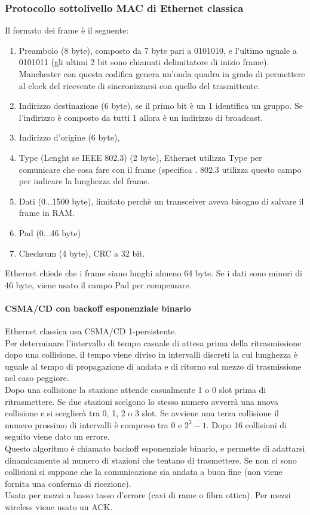\documentclass{article}
\begin{document}
\subsubsection{Protocollo sottolivello MAC di Ethernet classica}
Il formato dei frame è il seguente:
\begin{enumerate}
\item Preambolo (8 byte), composto da 7 byte pari a 0101010, e l'ultimo uguale a 0101011 (gli ultimi 2 bit sono chiamati delimitatore di inizio frame). \\
Manchester con questa codifica genera un'onda quadra in grado di permettere al clock del ricevente di sincronizzarsi con quello del trasmittente. \\
\item Indirizzo destinazione (6 byte), se il primo bit è un 1 identifica un gruppo. Se l'indirizzo è composto da tutti 1 allora è un indirizzo di broadcast.
\item Indirizzo d'origine (6 byte), 
\item Type (Lenght se IEEE 802.3) (2 byte), Ethernet utilizza Type per comunicare che cosa fare con il frame (specifica . 802.3 utilizza questo campo per indicare la lunghezza del frame. 
\item Dati (0...1500 byte), limitato perchè un transceiver aveva bisogno di salvare il frame in RAM. 
\item Pad (0...46 byte)
\item Checksum (4 byte), CRC a 32 bit. 
\end{enumerate}
Ethernet chiede che i frame siano lunghi almeno 64 byte. Se i dati sono minori di 46 byte, viene usato il campo Pad per compensare.
\paragraph{CSMA/CD con backoff esponenziale binario}
Ethernet classica usa CSMA/CD 1-persistente. \\
Per determinare l'intervallo di tempo casuale di attesa prima della ritrasmissione dopo una collisione, il tempo viene diviso in intervalli discreti la cui lunghezza è uguale al tempo di propagazione di andata e di ritorno sul mezzo di trasmissione nel caso peggiore.\\
Dopo una collisione la stazione attende casualmente 1 o 0 slot prima di ritrasmettere. Se due stazioni scelgono lo stesso numero avverrà una nuova collisione e si sceglierà tra 0, 1, 2 o 3 slot. Se avviene una terza collisione il numero prossimo di intervalli è compreso tra 0 e $2^3 -1$. Dopo 16 collisioni di seguito viene dato un errore. \\
Questo algoritmo è chiamato backoff esponenziale binario, e permette di adattarsi dinamicamente al numero di stazioni che tentano di trasmettere. Se non ci sono collisioni si suppone che la comunicazione sia andata a buon fine (non viene fornita una conferma di ricezione). \\ Usata per mezzi a basso tasso d'errore (cavi di rame o fibra ottica). Per mezzi wireless viene usato un ACK.
\end{document}
